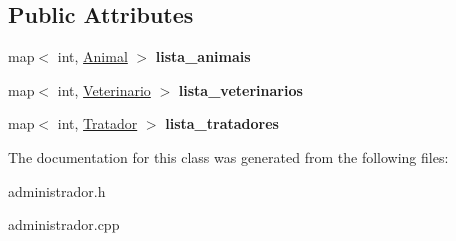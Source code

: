 \subsection*{Public Attributes}
\begin{DoxyCompactItemize}
\item 
\mbox{\label{classAdministrador_a66fe4f2a871cdad8af543c64cd0d5b2d}} 
map$<$ int, \hyperlink{classAnimal}{Animal} $>$ {\bfseries lista\+\_\+animais}
\item 
\mbox{\label{classAdministrador_a435ebedd446716b2e0b119b90aa65e96}} 
map$<$ int, \hyperlink{classVeterinario}{Veterinario} $>$ {\bfseries lista\+\_\+veterinarios}
\item 
\mbox{\label{classAdministrador_add46507963b9f708ac2ed16ee887c67d}} 
map$<$ int, \hyperlink{classTratador}{Tratador} $>$ {\bfseries lista\+\_\+tratadores}
\end{DoxyCompactItemize}


The documentation for this class was generated from the following files\+:\begin{DoxyCompactItemize}
\item 
administrador.\+h\item 
administrador.\+cpp\end{DoxyCompactItemize}
